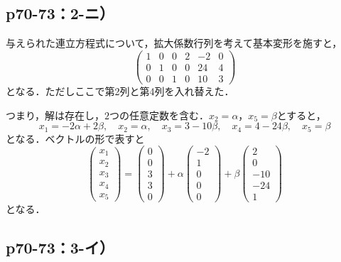 \documentclass[uplatex,dvipdfmx,a4paper,11pt,fleqn]{jsarticle}
\begin{document}
\subsection*{p70-73：2-ニ）}

\begin{tleftbar}
    与えられた連立方程式について，拡大係数行列を考えて基本変形を施すと，
    \[
        \begin{pmatrix} 1 & 0 & 0  & 2 & -2 & 0  \\ 0 & 1& 0  & 0 & 24 & 4 \\ 0 & 0 & 1 & 0 & 10 & 3 \end{pmatrix}
    \]
    となる．ただしここで第2列と第4列を入れ替えた．

    つまり，解は存在し，$2$つの任意定数を含む．$x_2 = \alpha$，$x_5 = \beta$とすると，
    \[
        x_1 = -2\alpha + 2\beta  , \quad x_2 =\alpha  , \quad x_3 = 3 -10\beta  , \quad x_4 = 4 -24 \beta ,\quad x_5 =\beta 
    \]
    となる．ベクトルの形で表すと
    \[
        \begin{pmatrix} x_1 \\ x_2 \\ x_3 \\ x_4 \\ x_5 \end{pmatrix}= \begin{pmatrix} 0 \\ 0 \\ 3 \\ 3 \\ 0 \end{pmatrix} +\alpha \begin{pmatrix} -2 \\ 1\\ 0 \\ 0 \\ 0 \end{pmatrix} + \beta \begin{pmatrix} 2 \\ 0 \\ -10 \\ -24 \\ 1 \end{pmatrix}
    \]
    となる．
\end{tleftbar}


\newpage
    \subsection*{p70-73：3-イ）}
\end{document}
